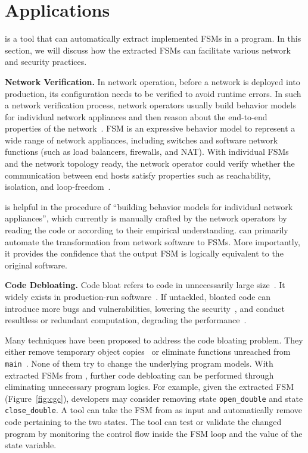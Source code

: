 
\section{Applications}
\Tool{} is a tool that can automatically extract implemented FSMs in a program. 
In this section, we will discuss how the extracted FSMs can facilitate 
various network and security practices.  


\noindent\textbf{Network Verification.}  In network operation, before a network 
is deployed into production, its configuration needs to be verified to avoid 
runtime errors. In such a network verification process, network operators 
usually build behavior models for individual network appliances and then 
reason about the end-to-end properties of the 
network~\cite{mai2011debugging,khurshid2013veriflow,kazemian2012header,kazemian2013real,fayaz2016buzz,panda2017verifying}. 
FSM is an expressive 
behavior model to represent a wide range of network appliances, including 
switches and software network functions (such as load balancers, firewalls, 
and NAT). With individual FSMs and the network topology ready, the network 
operator could verify whether the communication between end hosts satisfy 
properties such as reachability, isolation, and loop-freedom~\cite{xxx}.

\Tool{} is helpful in the procedure of ``building behavior models for 
individual network appliances'', which currently is manually crafted by 
the network operators by reading the code or according to their 
empirical understanding. \Tool{} can primarily automate the 
transformation from network software to FSMs. More importantly, it 
provides the confidence that the output FSM is logically equivalent 
to the original software.


\noindent\textbf{Code Debloating.}
Code bloat refers to code in unnecessarily large size~\cite{code-bloat}.
It widely exists in production-run software~\cite{code-bloat-study}. 
If untackled, bloated code can introduce more bugs and vulnerabilities, 
lowering the security~\cite{protocol-mao}, 
and conduct resultless or redundant computation, 
degrading the performance~\cite{BloatFSE2008,XuBloatPLDI2009,XuBloatPLDI2010}. 

Many techniques have been proposed to address the code bloating problem. 
They either remove temporary object copies~\cite{BloatFSE2008,XuBloatPLDI2009,
XuBloatPLDI2010,Reusable,Cachetor} 
or eliminate functions unreached from 
\texttt{main}~\cite{container-debloating-1, 
container-debloating-2, dinghao-1}. 
None of them try to change the underlying program models.
With extracted FSMs from \Tool{}, 
further code debloating can be performed through
eliminating unnecessary program logics. 
For example, given the extracted FSM (Figure~\ref{fig:cgc}), 
developers may consider removing state \texttt{open\_double} and 
state \texttt{close\_double}. 
A tool can take the FSM from \Tool{} as input and automatically 
remove code pertaining to the two states. 
The tool can test or validate the changed program 
by monitoring the control flow 
inside the FSM loop and the value of the state variable.


